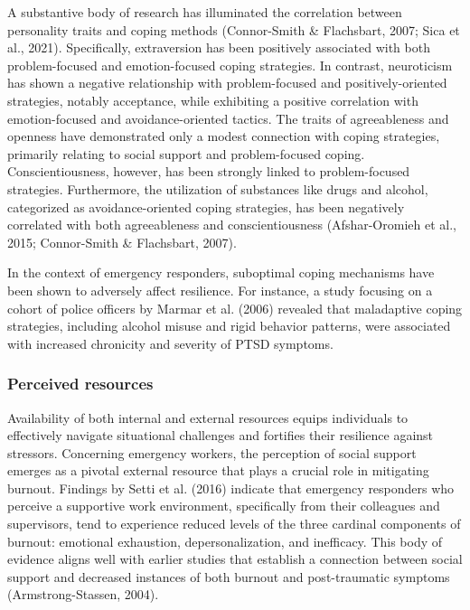 \documentclass[
  man,floatsintext]{apa7}
\begin{document}
A substantive body of research has illuminated the correlation between personality traits and coping methods (Connor-Smith \& Flachsbart, 2007; Sica et al., 2021). Specifically, extraversion has been positively associated with both problem-focused and emotion-focused coping strategies. In contrast, neuroticism has shown a negative relationship with problem-focused and positively-oriented strategies, notably acceptance, while exhibiting a positive correlation with emotion-focused and avoidance-oriented tactics. The traits of agreeableness and openness have demonstrated only a modest connection with coping strategies, primarily relating to social support and problem-focused coping. Conscientiousness, however, has been strongly linked to problem-focused strategies. Furthermore, the utilization of substances like drugs and alcohol, categorized as avoidance-oriented coping strategies, has been negatively correlated with both agreeableness and conscientiousness (Afshar-Oromieh et al., 2015; Connor-Smith \& Flachsbart, 2007).

In the context of emergency responders, suboptimal coping mechanisms have been shown to adversely affect resilience. For instance, a study focusing on a cohort of police officers by Marmar et al. (2006) revealed that maladaptive coping strategies, including alcohol misuse and rigid behavior patterns, were associated with increased chronicity and severity of PTSD symptoms.

\hypertarget{perceived-resources}{%
\subsubsection{Perceived resources}\label{perceived-resources}}

Availability of both internal and external resources equips individuals to effectively navigate situational challenges and fortifies their resilience against stressors. Concerning emergency workers, the perception of social support emerges as a pivotal external resource that plays a crucial role in mitigating burnout. Findings by Setti et al. (2016) indicate that emergency responders who perceive a supportive work environment, specifically from their colleagues and supervisors, tend to experience reduced levels of the three cardinal components of burnout: emotional exhaustion, depersonalization, and inefficacy. This body of evidence aligns well with earlier studies that establish a connection between social support and decreased instances of both burnout and post-traumatic symptoms (Armstrong-Stassen, 2004).
\end{document}
